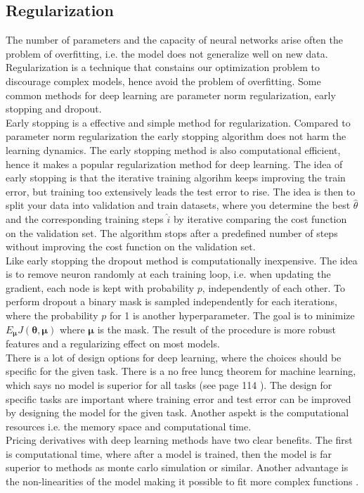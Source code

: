 \subsection{Regularization}\label{regularization}
The number of parameters and the capacity of neural networks arise often the problem of overfitting, i.e. the model does not generalize well on new data. Regularization is a technique that constains our optimization problem to discourage complex models, hence avoid the problem of overfitting. Some common methods for deep learning are parameter norm regularization, early stopping and dropout.\\

Early stopping is a effective and simple method for regularization. Compared to parameter norm regularization the early stopping algorithm does not harm the learning dynamics. The early stopping method is also computational efficient, hence it makes a popular regularization method for deep learning. The idea of early stopping is that the iterative training algorihm keeps improving the train error, but training too extensively leads the test error to rise. The idea is then to split your data into validation and train datasets, where you determine the best $\hat{\theta}$ and the corresponding training steps $\hat{i}$ by iterative comparing the cost function on the validation set. The algorithm stops after a predefined number of steps without improving the cost function on the validation set.\\

Like early stopping the dropout method is computationally inexpensive. The idea is to remove neuron randomly at each training loop, i.e. when updating the gradient, each node is kept with probability $p$, independently of each other. To perform dropout a binary mask is sampled independently for each iterations, where the probability $p$ for 1 is another hyperparameter. The goal is to minimize $E_{\bm{\mu}} J(\bm{\theta}, \bm{\mu})$ where $\bm{\mu}$ is the mask. The result of the procedure is more robust features and a regularizing effect on most models.\\

There is a lot of design options for deep learning, where the choices should be specific for the given task. There is a no free luncg theorem for machine learning, which says no model is superior for all tasks (see page 114 \parencite{Goodfellow-et-al-2016}). The design for specific tasks are important where training error and test error can be improved by designing the model for the given task. Another aspekt is the computational resources i.e. the memory space and computational time. \\

Pricing derivatives with deep learning methods have two clear benefits. The first is computational time, where after a model is trained, then the model is far superior to methods as monte carlo simulation or similar. Another advantage is the non-linearities of the model making it possible to fit more complex functions \parencite{Goodfellow-et-al-2016}.
